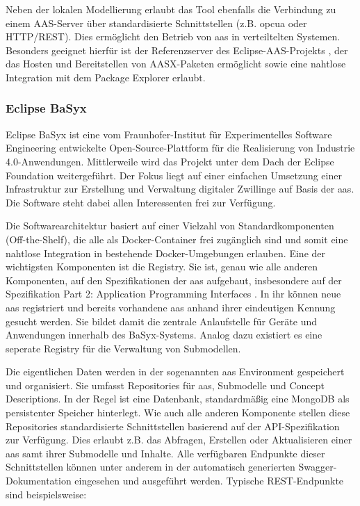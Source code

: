 Neben der lokalen Modellierung erlaubt das Tool ebenfalls die Verbindung zu einem AAS-Server über standardisierte Schnittstellen (z.B. \acs{opcua} oder HTTP/REST).
Dies ermöglicht den Betrieb von \acs{aas} in verteiltelten Systemen.
Besonders geeignet hierfür ist der Referenzserver des Eclipse-AAS-Projekts \cite{AASXServer}, der das Hosten und Bereitstellen von AASX-Paketen ermöglicht sowie eine nahtlose Integration mit dem Package Explorer erlaubt.

\subsubsection{Eclipse BaSyx }
Eclipse BaSyx ist eine vom Fraunhofer-Institut für Experimentelles Software Engineering entwickelte Open-Source-Plattform für die Realisierung von Industrie 4.0-Anwendungen.
Mittlerweile wird das Projekt unter dem Dach der Eclipse Foundation weitergeführt.
Der Fokus liegt auf einer einfachen Umsetzung einer Infrastruktur zur Erstellung und Verwaltung digitaler Zwillinge auf Basis der \acs{aas}.
Die Software steht dabei allen Interessenten frei zur Verfügung.

Die Softwarearchitektur basiert auf einer Vielzahl von Standardkomponenten (Off-the-Shelf), die alle als Docker-Container frei zugänglich sind und somit eine nahtlose Integration in bestehende Docker-Umgebungen erlauben.
Eine der wichtigsten Komponenten ist die Registry. 
Sie ist, genau wie alle anderen Komponenten, auf den Spezifikationen der \acs{aas} aufgebaut, insbesondere auf der Spezifikation Part 2: Application Programming Interfaces \cite{SpezifikationPart2}.
In ihr können neue \acs{aas} registriert und bereits vorhandene \acs{aas} anhand ihrer eindeutigen Kennung gesucht werden.
Sie bildet damit die zentrale Anlaufstelle für Geräte und Anwendungen innerhalb des BaSyx-Systems.
Analog dazu existiert es eine seperate Registry für die Verwaltung von Submodellen.

Die eigentlichen Daten werden in der sogenannten \acs{aas} Environment gespeichert und organisiert.
Sie umfasst Repositories für \acs{aas}, Submodelle und Concept Descriptions.
In der Regel ist eine Datenbank, standardmäßig eine MongoDB als persistenter Speicher hinterlegt.
Wie auch alle anderen Komponente stellen diese Repositories standardisierte Schnittstellen basierend auf der API-Spezifikation zur Verfügung.
Dies erlaubt z.B. das Abfragen, Erstellen oder Aktualisieren einer \acs{aas} samt ihrer Submodelle und Inhalte.
Alle verfügbaren Endpunkte dieser Schnittstellen können unter anderem in der automatisch generierten Swagger-Dokumentation eingesehen und ausgeführt werden. 
Typische REST-Endpunkte sind beispielsweise:

